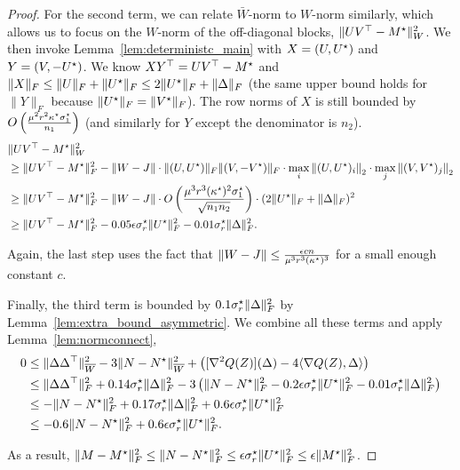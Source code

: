 \begin{proof}
For the second term, we can relate $\bar W$-norm to $W$-norm similarly, which allows us to focus on the $W$-norm of the off-diagonal blocks, $\|UV^\top - M^\star\|_W^2$.
We then invoke Lemma~\ref{lem:deterministc_main} with $X = (U, U^\star)$ and $Y = (V, -U^\star)$.
We know $X Y^\top = U V^\top - M^\star$ and $\|X\|_F \le \|U\|_F + \|U^\star\|_F \le 2\|U^\star\|_F + \|\Delta\|_F$ (the same upper bound holds for $\|Y\|_F$ because $\|U^\star\|_F = \|V^\star\|_F$). The row norms of $X$ is still bounded by $O\left(\frac{\mu^2 r^2 \kappa^\star \sigma^\star_1}{n_1}\right)$ (and similarly for $Y$ except the denominator is $n_2$).
\begin{align*}
& \|UV^\top - M^\star\|_W^2 \\
& \ge \|UV^\top - M^\star\|_F^2 - \|W-J\| \cdot \|(U,U^\star)\|_F \|(V,-V^\star)\|_F \cdot \max_i {\lVert(U,U^\star)_i{\rVert}}_2 \cdot \max_j {\lVert(V,V^\star)_j{\rVert}}_2 \\
& \ge \|UV^\top - M^\star\|_F^2 - \|W-J\| \cdot O\left(\frac{\mu^3 r^3 (\kappa^\star)^2 \sigma^\star_1}{\sqrt{n_1n_2}}\right)\cdot (2\|U^\star\|_F + \|\Delta\|_F)^2 \\
& \ge \|UV^\top - M^\star\|_F^2 - 0.05 \epsilon\sigma^\star_r \|U^\star\|_F^2 -0.01\sigma^\star_r \|\Delta\|_F^2.
\end{align*}

Again, the last step uses the fact that $\|W-J\| \le \frac{\epsilon cn}{\mu^3 r^3 (\kappa^\star)^3}$ for a small enough constant $c$. 

Finally, the third term is bounded by $0.1\sigma^\star_r\|\Delta\|_F^2$ by Lemma~\ref{lem:extra_bound_asymmetric}. We combine all these terms and apply Lemma~\ref{lem:normconnect},
\begin{align*}
0 &\le \|\Delta\Delta^\top\|_{\overline{W}}^2 - 3\|N- N^\star\|_{\overline{W}}^2 + \left([\nabla^2 Q(Z)](\Delta) - 4\langle \nabla Q(Z), \Delta\rangle\right) \\
& \le \|\Delta\Delta^\top\|_F^2 + 0.14\sigma^\star_r \|\Delta\|_F^2 - 3\left(\|N- N^\star\|_F^2 - 0.2 \epsilon\sigma^\star_r \|U^\star\|_F^2 -0.01\sigma^\star_r \|\Delta\|_F^2\right) \\
& \le -\|N- N^\star\|_F^2 + 0.17 \sigma^\star_r\|\Delta\|_F^2 + 0.6 \epsilon \sigma^\star_r \|U^\star\|_F^2 \\
& \le -0.6\|N- N^\star\|_F^2 + 0.6 \epsilon\sigma^\star_r \|U^\star\|_F^2.
\end{align*}

As a result, $\|M-M^\star\|_F^2 \le \|N-N^\star\|_F^2 \le \epsilon \sigma^\star_r \|U^\star\|_F^2 \le \epsilon \|M^\star\|_F^2$. %
\end{proof}